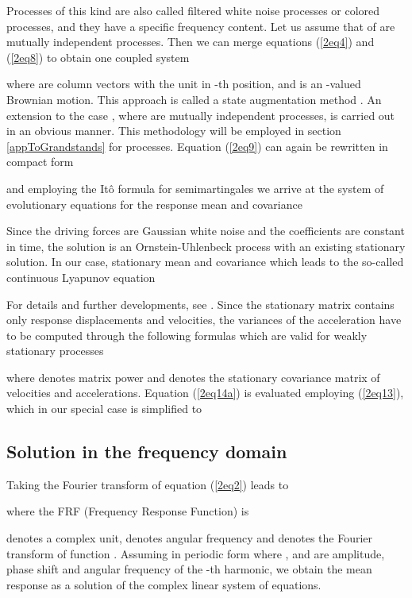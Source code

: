 \documentclass[preprint,12pt,authoryear]{elsarticle}
\begin{document}
Processes of this kind are also called filtered white noise processes or colored processes, and they have a specific frequency content. Let us assume that  of   are mutually independent  processes. Then we can merge equations (\ref{2eq4}) and (\ref{2eq8}) to obtain one coupled system

where  are column vectors with the unit in -th position, and  is an -valued Brownian motion. This approach is called a state augmentation method \citep{Grigoriu_stoch}. An extension to the case , where  are mutually independent  processes, is carried out in an obvious manner. This methodology will be employed in section \ref{appToGrandstands} for  processes. Equation (\ref{2eq9}) can again be rewritten in compact form

and employing the It\^{o} formula for semimartingales we arrive at the system of evolutionary equations for the response mean  and covariance 

Since the driving forces  are Gaussian white noise and the coefficients are constant in time, the solution is an Ornstein-Uhlenbeck process with an existing stationary solution. In our case, stationary mean  and covariance  which leads to the so-called continuous Lyapunov equation

For details and further developments, see \citep{Grigoriu_stoch}. Since the stationary matrix  contains only response displacements and velocities, the variances of the acceleration have to be computed through the following formulas which are valid for weakly stationary processes

where  denotes matrix power and  denotes the stationary covariance matrix of velocities and accelerations. Equation (\ref{2eq14a}) is evaluated employing (\ref{2eq13}), which in our special case is simplified to

\subsection{Solution in the frequency domain}
\label{frequencydomain}
Taking the Fourier transform of equation (\ref{2eq2}) leads to

where the FRF (Frequency Response Function)  is

 denotes a complex unit,  denotes angular frequency and  denotes the Fourier transform of function . Assuming  in periodic form  where ,  and  are amplitude, phase shift and angular frequency of the -th harmonic, we obtain the mean response as a solution of the complex linear system of equations.
\end{document}
